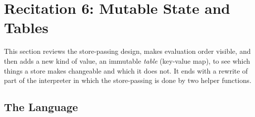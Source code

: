 \section{Recitation 6: Mutable State and Tables}
\label{sec:rec6}

This section reviews the store-passing design, makes evaluation order visible, and then adds a new kind of value, an immutable \emph{table} (key-value map), to see which things a store makes changeable and which it does not. It ends with a rewrite of part of the interpreter in which the store-passing is done by two helper functions.

\subsection{The Language}

